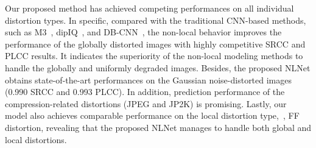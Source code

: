 	Our proposed method has achieved competing performances on all individual distortion types. In specific, compared with the traditional CNN-based methods, such as M3~\citep{xue2014blind}, dipIQ~\citep{ma2017dipiq}, and DB-CNN~\citep{zhang2018blind}, the non-local behavior improves the performance of the globally distorted images with highly competitive SRCC and PLCC results. It indicates the superiority of the non-local modeling methods to handle the globally and uniformly degraded images. Besides, the proposed NLNet obtains state-of-the-art performances on the Gaussian noise-distorted images (0.990 SRCC and 0.993 PLCC). In addition, prediction performance of the compression-related distortions (JPEG and JP2K) is promising. Lastly, our model also achieves comparable performance on the local distortion type,~\ie, FF distortion, revealing that the proposed NLNet manages to handle both global and local distortions.
